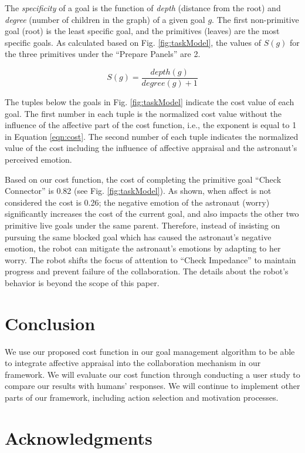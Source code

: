 \documentclass[conference]{IEEEtran}
\begin{document}
The \textit{specificity} of a goal is the function of \textit{depth} (distance
from the root) and \textit{degree} (number of children in the graph) of a given
goal $g$. The first non-primitive goal (root) is the least specific goal, and
the primitives (leaves) are the most specific goals. As calculated based on Fig.
\ref{fig:taskModel}, the values of $S(g)$ for the three primitives under the
``Prepare Panels'' are 2.

\vspace*{-2mm}
\begin{equation}
S(g) = \frac{depth(g)}{degree(g)+1}
\label{eqn:specificity}
\end{equation}

\vspace*{-1mm}
The tuples below the goals in Fig. \ref{fig:taskModel} indicate the cost value
of each goal. The first number in each tuple is the normalized cost value
without the influence of the affective part of the cost function, i.e., the
exponent is equal to 1 in Equation \ref{eqn:cost}. The second number of each
tuple indicates the normalized value of the cost including the influence of
affective appraisal and the astronaut's perceived emotion.

Based on our cost function, the cost of completing the primitive goal ``Check
Connector'' is 0.82 (see Fig. \ref{fig:taskModel}). As shown, when affect is
not considered the cost is 0.26; the negative emotion of the astronaut (worry)
significantly increases the cost of the current goal, and also impacts the other
two primitive live goals under the same parent. Therefore, instead of insisting
on pursuing the same blocked goal which has caused the astronaut's negative
emotion, the robot can mitigate the astronaut's emotions by adapting to her
worry. The robot shifts the focus of attention to ``Check Impedance'' to
maintain progress and prevent failure of the collaboration. The details about
the robot's behavior is beyond the scope of this paper.

\vspace*{-1mm}
\section{Conclusion}
\vspace*{-1mm}
We use our proposed cost function in our goal management algorithm to be able to
integrate affective appraisal into the collaboration mechanism in our framework.
We will evaluate our cost function through conducting a user study to compare
our results with humans' responses. We will continue to implement other parts of
our framework, including action selection and motivation processes.

\section{Acknowledgments}
\vspace*{-1mm}

\vspace*{-2mm}



\end{document}
